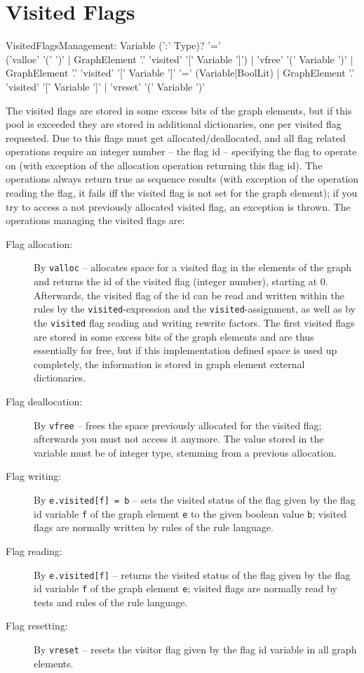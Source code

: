  
\section{Visited Flags}

\begin{rail}
  VisitedFlagsManagement:
    Variable (':' Type)? '=' \\('valloc' '(' ')' | GraphElement '.' 'visited' '[' Variable ']') |
    'vfree' '(' Variable ')' |
    GraphElement '.' 'visited' '[' Variable ']' '=' (Variable|BoolLit) |
    GraphElement '.' 'visited' '[' Variable ']' |
    'vreset' '(' Variable ')'
\end{rail}\label{allocvisitflag}\label{freevisitflag}
The visited flags are stored in some excess bits of the graph elements, but if this pool is exceeded they are stored in additional dictionaries, one per visited flag requested.
Due to this flags must get allocated/deallocated, and all flag related operations require an integer number -- the flag id -- specifying the flag to operate on (with exception of the allocation operation returning this flag id).
The operations always return true as sequence results (with exception of the operation reading the flag, it fails iff the visited flag is not set for the graph element); if you try to access a not previously allocated visited flag, an exception is thrown.
The operations managing the visited flags are:
\begin{description}
\item[Flag allocation:] By \texttt{valloc} -- allocates space for a visited flag in the elements of the graph and returns the id of the visited flag (integer number), starting at 0.
Afterwards, the visited flag of the id can be read and written within the rules by the \texttt{visited}-expression and the \texttt{visited}-assignment,
as well as by the \texttt{visited} flag reading and writing rewrite factors.
The first visited flags are stored in some excess bits of the graph elements and are thus essentially for free, but if this implementation defined space is used up completely, the information is stored in graph element external dictionaries.
\item[Flag deallocation:] By \texttt{vfree} -- frees the space previously allocated for the visited flag; afterwards you must not access it anymore. 
The value stored in the variable must be of integer type, stemming from a previous allocation.
\item[Flag writing:] By \texttt{e.visited[f] = b} -- sets the visited status of the flag given by the flag id variable \texttt{f} of the graph element \texttt{e} to the given boolean value \texttt{b}; visited flags are normally written by rules of the rule language.
\item[Flag reading:] By \texttt{e.visited[f]} -- returns the visited status of the flag given by the flag id variable \texttt{f} of the graph element \texttt{e}; visited flags are normally read by tests and rules of the rule language.
\item[Flag resetting:] By \texttt{vreset} -- resets the visitor flag given by the flag id variable in all graph elements.
\end{description}


